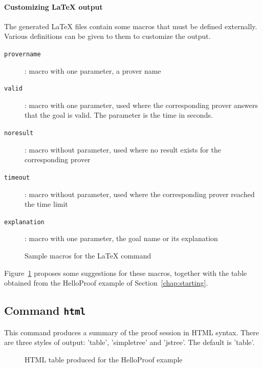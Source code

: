 \paragraph{Customizing LaTeX output}

The generated LaTeX files contain some macros that must be defined
externally.  Various definitions can be given to them to customize the
output.
\begin{description}
\item[\texttt{\bs{}provername}]: macro with one parameter, a prover name
\item[\texttt{\bs{}valid}]: macro with one parameter, used where the corresponding prover answers that the goal is valid. The parameter is the time in seconds.
\item[\texttt{\bs{}noresult}]: macro without parameter, used where no result
  exists for the corresponding prover
\item[\texttt{\bs{}timeout}]: macro without parameter, used where the corresponding prover reached the time limit
\item[\texttt{\bs{}explanation}]: macro with one parameter, the goal name or its explanation
\end{description}

\begin{figure}[t]
  \begin{center}
    
  \end{center}
  
  \caption{Sample macros for the LaTeX command}
\label{fig:latex}
\end{figure}

Figure~\ref{fig:latex} proposes some suggestions for these macros,
together with the table obtained from the HelloProof example of
Section~\ref{chap:starting}.

\subsection{Command \texttt{html}}

This command produces a summary of the proof session in HTML syntax.
There are three styles of output: 'table', 'simpletree' and
'jstree'. The default is 'table'.

\begin{figure}[t]
  \begin{center}
  \end{center}
  \caption{HTML table produced for the HelloProof example}
\label{fig:html}
\end{figure}

